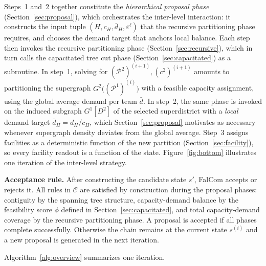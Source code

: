 \documentclass[preprint,12pt,authoryear]{elsarticle}
\theoremstyle{definition}
\begin{document}
Steps~1 and~2 together constitute the \emph{hierarchical proposal phase}
(Section~\ref{sec:proposal}), which orchestrates the inter-level
interaction: it constructs the input tuple
$(H, c_H, \bar{d}_H, \varepsilon^\ell)$ that the recursive partitioning
phase requires, and chooses the demand target that anchors local
balance. Each step then invokes the recursive partitioning phase
(Section~\ref{sec:recursive}), which in turn calls the capacitated tree
cut phase (Section~\ref{sec:capacitated}) as a subroutine. In step~1,
solving for $(\mathcal{P}^2)^{(i+1)}, (c^2)^{(i+1)}$ amounts to
partitioning the supergraph $G^2\bigl((\mathcal{P}^1)^{(i)}\bigr)$ with
a feasible capacity assignment, using the global average demand per team
$\bar{d}$. In step~2, the same phase is invoked on the induced subgraph
$G^1[D^2]$ of the selected superdistrict with a \emph{local} demand
target $\bar{d}_H = d_H / c_H$, which Section~\ref{sec:proposal}
motivates as necessary whenever supergraph density deviates from the
global average. Step~3 assigns facilities as a deterministic function of the new partition (Section~\ref{sec:facility}), so every facility readout is a function of the state. Figure~\ref{fig:bottom}
illustrates one iteration of the inter-level strategy.


\medskip

\noindent\textbf{Acceptance rule.}\quad
After constructing the candidate state $s'$, FalCom accepts or rejects it.
All rules in $\mathcal{C}$ are satisfied by construction during the proposal
phases: contiguity by the spanning tree structure, capacity-demand balance
by the feasibility score $\phi$ defined in Section~\ref{sec:capacitated},
and total capacity-demand coverage by the recursive partitioning phase.
A proposal is accepted if all phases complete successfully. Otherwise the
chain remains at the current state $s^{(i)}$ and a new proposal is generated
in the next iteration.

Algorithm~\ref{alg:overview} summarizes one iteration.

\medskip
\end{document}
